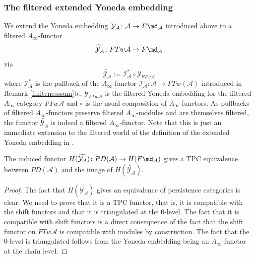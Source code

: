 \subsubsection{The filtered extended Yoneda embedding}\label{extendedYoneda}
We extend the Yoneda embedding $\mathcal{Y}_\mathcal{A}\colon \mathcal{A}\to F\md_{\mathcal{A}}$ introduced above to a filtered $A_\infty$-functor $$\widetilde{\mathcal{Y}_\mathcal{A}}\colon FTw\mathcal{A}\to F
\md_{\mathcal{A}}$$ via $$\widetilde{\mathcal{Y}_\mathcal{A}}:= \mathcal{I}_\mathcal{A}^*\circ \mathcal{Y}_{FTw\mathcal{A}}$$ where $\mathcal{I}_\mathcal{A}^*$ is the pullback of the $A_\infty$-functor $\mathcal{I}_\mathcal{A}\colon \mathcal{A}\to FTw(\mathcal{A})$ introduced in Remark \ref{finitenesssum}b., $\mathcal{Y}_{FTw\mathcal{A}}$ is the filtered Yoneda embedding for the filtered $A_\infty$-category $FTw\mathcal{A}$ and $\circ$ is the usual composition of $A_\infty$-functors. As pullbacks of filtered $A_\infty$-functors preserve filtered $A_\infty$-modules and are themselves filtered, the functor $\widetilde{\mathcal{Y}_A}$ is indeed a filtered $A_\infty$-functor. Note that this is just an immediate extension to the filtered world of the definition of the extended Yoneda embedding in \cite[Section (3s)]{Se:book-fukaya-categ}.
\begin{prop}
	The induced functor $H(\widetilde{\mathcal{Y}_\mathcal{A}})\colon PD(\mathcal{A})\to H(F	\md_{\mathcal{A}})$ gives a TPC equivalence between $PD(\mathcal{A})$ and the image of $H(\widetilde{\mathcal{Y}_\mathcal{A}})$.
\end{prop}
\begin{proof}
	The fact that $H(\widetilde{\mathcal{Y}_\mathcal{A}})$ gives an equivalence of persistence categories is clear. We need to prove that it is a TPC functor, that is, it is compatible with the shift functors and that it is triangulated at the $0$-level. The fact that it is compatible with shift functors is a direct consequence of the fact that the shift functor on $FTw\mathcal{A}$ is compatible with modules by construction. The fact that the $0$-level is triangulated follows from the Yoneda embedding being an $A_\infty$-functor at the chain level.
\end{proof}

